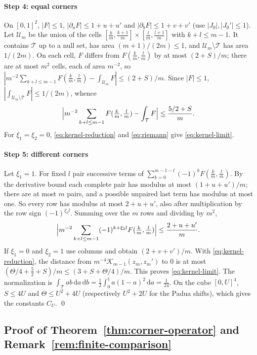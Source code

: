 \documentclass[preprint,12pt,a4paper]{elsarticle}
\theoremstyle{remark}
\newcommand{\dd}{\,\mathrm d}
\begin{document}
\paragraph{Step 4: equal corners}
On $[0,1]^2$, $|F|\le1$, $|\partial_aF|\le1+u+u'$ and $|\partial_bF|\le1+v+v'$
(use $|J_0|,|J_0'|\le1$). Let $\mathcal U_m$ be the union of the cells
$[\frac km,\frac{k+1}m]\times[\frac lm,\frac{l+1}m]$ with $k+l\le m-1$. It
contains $\mathcal T$ up to a null set, has area $(m+1)/(2m)\le1$, and
$\mathcal U_m\setminus\mathcal T$ has area $1/(2m)$. On each cell, $F$ differs from
$F(\frac km,\frac lm)$ by at most $(2+S)/m$; there are at most $m^2$ cells, each of
area $m^{-2}$, so
$|m^{-2}\sum_{k+l\le m-1}F(\frac km,\frac lm)-\int_{\mathcal U_m}F|\le(2+S)/m$.
Since $|F|\le1$, $|\int_{\mathcal U_m\setminus\mathcal T}F|\le1/(2m)$, whence
\begin{equation}\label{eq:riemann}
 \Bigl|m^{-2}\sum_{k+l\le m-1}F(\tfrac km,\tfrac lm)-\int_{\mathcal T}F\Bigr|\le\frac{5/2+S}m .
\end{equation}
For $\xi_1=\xi_2=0$, \eqref{eq:kernel-reduction} and \eqref{eq:riemann}
give \eqref{eq:kernel-limit}.

\paragraph{Step 5: different corners}
Let $\xi_1=1$. For fixed $l$ pair successive terms of
$\sum_{k=0}^{m-1-l}(-1)^kF(\frac km,\frac lm)$. By the derivative bound each
complete pair has modulus at most $(1+u+u')/m$; there are at most $m$ pairs, and
a possible unpaired last term has modulus at most one. So every row has modulus
at most $2+u+u'$, also after multiplication by the row sign $(-1)^{\xi_2 l}$.
Summing over the $m$ rows and dividing by $m^2$,
\begin{equation}\label{eq:alternating}
 \Bigl|m^{-2}\sum_{k+l\le m-1}(-1)^{k+\xi_2 l}F(\tfrac km,\tfrac lm)\Bigr|
 \le\frac{2+u+u'}m .
\end{equation}
If $\xi_1=0$ and $\xi_2=1$ use columns and obtain $(2+v+v')/m$. With
\eqref{eq:kernel-reduction}, the distance from $m^{-4}\mathcal K_{m-1}(z_m,z_m')$
to $0$ is at most $(\Theta/4+\frac52+S)/m\le(3+S+\Theta/4)/m$. This proves
\eqref{eq:kernel-limit}. The normalization is
$\int_{\mathcal T}ab\dd a\dd b=\frac12\int_0^1a(1-a)^2\dd a=\frac1{24}$. On the cube
$[0,U]^4$, $S\le4U$ and $\Theta\le U^2+4U$ (respectively $U^2+2U$ for the
Padua shifts), which gives the constants $C_U$. \qed

\subsection{Proof of Theorem~\ref{thm:corner-operator} and Remark~\ref{rem:finite-comparison}}\label{app:operator}
\end{document}
